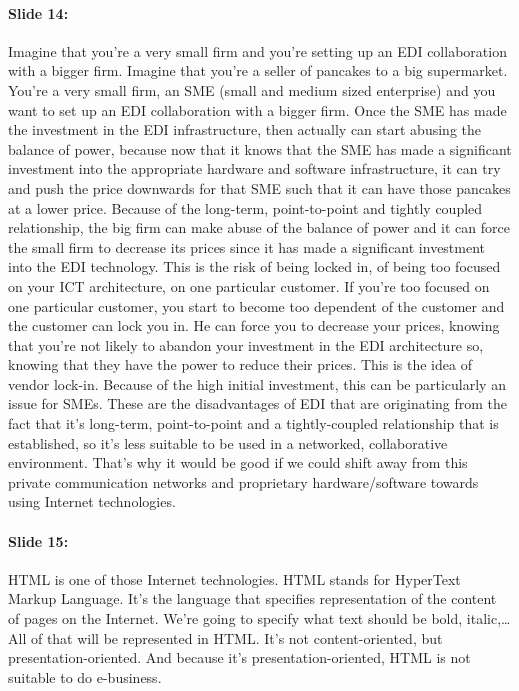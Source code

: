 \documentclass[10pt,a4paper]{report}
\begin{document}
\paragraph{Slide 14:}Imagine that you're a very small firm and you're setting up an EDI collaboration with a bigger firm. Imagine that you're a seller of pancakes to a big supermarket. You're a very small firm, an SME (small and medium sized enterprise) and you want to set up an EDI collaboration with a bigger firm. Once the SME has made the investment in the EDI infrastructure, then actually can start abusing the balance of power, because now that it knows that the SME has made a significant investment into the appropriate hardware and software infrastructure, it can try and push the price downwards for that SME such that it can have those pancakes at a lower price. Because of the long-term, point-to-point and tightly coupled relationship, the big firm can make abuse of the balance of power and it can force the small firm to decrease its prices since it has made a significant investment into the EDI technology. This is the risk of being locked in, of being too focused on your ICT architecture, on one particular customer. If you're too focused on one particular customer, you start to become too dependent of the customer and the customer can lock you in. He can force you to decrease your prices, knowing that you're not likely to abandon your investment in the EDI architecture so, knowing that they have the power to reduce their prices. This is the idea of vendor lock-in. Because of the high initial investment, this can be particularly an issue for SMEs. These are the disadvantages of EDI that are originating from the fact that it's long-term, point-to-point and a tightly-coupled relationship that is established, so it's less suitable to be used in a networked, collaborative environment.
That’s why it would be good if we could shift away from this private communication networks and proprietary hardware/software towards using Internet technologies.

\paragraph{Slide 15:}HTML is one of those Internet technologies. HTML stands for HyperText Markup Language. It's the language that specifies representation of the content of pages on the Internet. We're going to specify what text should be bold, italic,… All of that will be represented in HTML. It's not content-oriented, but presentation-oriented. And because it's presentation-oriented, HTML is not suitable to do e-business.
\end{document}
